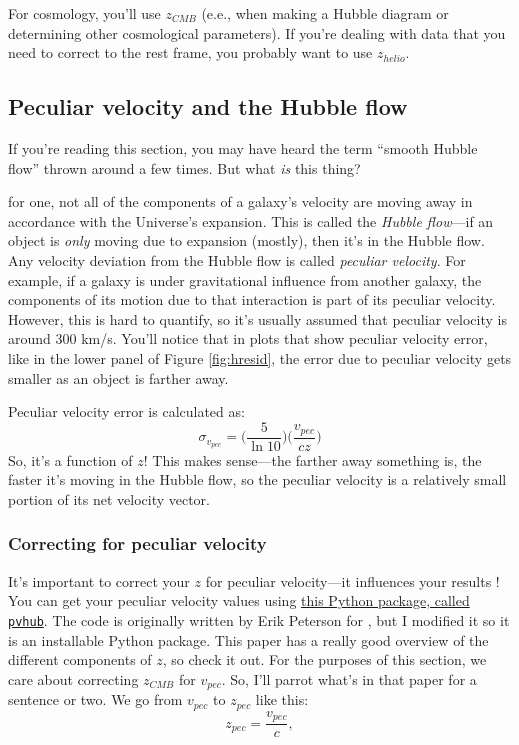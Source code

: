 For cosmology, you'll use $z_{CMB}$ (e.e., when making a Hubble diagram or determining other cosmological parameters). If you're dealing with data that you need to correct to the rest frame, you probably want to use $z_{helio}$.

\subsection{Peculiar velocity and the Hubble flow}
\label{sec:vpec}
If you're reading this section, you may have heard the term ``smooth Hubble flow'' thrown around a few times. But what \textit{is} this thing?

for one, not all of the components of a galaxy's velocity are moving away in accordance with the Universe's expansion. This is called the \textit{Hubble flow}---if an object is \textit{only} moving due to expansion (mostly), then it's in the Hubble flow. Any velocity deviation from the Hubble flow is called \textit{peculiar velocity}. For example, if a galaxy is under gravitational influence from another galaxy, the components of its motion due to that interaction is part of its peculiar velocity. However, this is hard to quantify, so it's usually assumed that peculiar velocity is around 300 km/s. You'll notice that in plots that show peculiar velocity error, like in the lower panel of Figure \ref{fig:hresid}, the error due to peculiar velocity gets smaller as an object is farther away. 

Peculiar velocity error is calculated as:
\begin{equation}
\label{eqn:evpec}
    \sigma_{v_{pec}} = \Big( \frac{5}{\ln 10} \Big) \Big( \frac{v_{pec}}{cz} \Big)
\end{equation}
So, it's a function of $z$! This makes sense---the farther away something is, the faster it's moving in the Hubble flow, so the peculiar velocity is a relatively small portion of its net velocity vector. 

\subsubsection{Correcting for peculiar velocity}
\label{sec:pvcorrections}
It's important to correct your $z$ for peculiar velocity---it influences your results \cite{Peterson2022}! You can get your peculiar velocity values using \href{https://github.com/laldoroty/pvhub/tree/make_installable}{this Python package, called \texttt{pvhub}}. The code is originally written by Erik Peterson for \cite{Peterson2022}, but I modified it so it is an installable Python package. This paper has a really good overview of the different components of $z$, so check it out. For the purposes of this section, we care about correcting $z_{CMB}$ for $v_{pec}$. So, I'll parrot what's in that paper for a sentence or two. We go from $v_{pec}$ to $z_{pec}$ like this:
\begin{equation}
    z_{pec} = \frac{v_{pec}}{c},
\end{equation}


